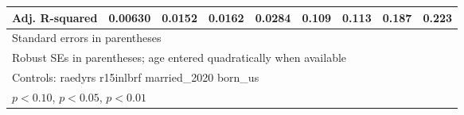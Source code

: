 \begin{table}[htbp]
\begin{tabular}{l*{8}{c}}
Adj. R-squared  &  0.00630         &   0.0152         &   0.0162         &   0.0284         &    0.109         &    0.113         &    0.187         &    0.223         \\
\bottomrule
\multicolumn{9}{l}{\footnotesize Standard errors in parentheses}\\
\multicolumn{9}{l}{\footnotesize Robust SEs in parentheses; age entered quadratically when available}\\
\multicolumn{9}{l}{\footnotesize Controls:  raedyrs r15inlbrf married\_2020 born\_us}\\
\multicolumn{9}{l}{\footnotesize \sym{*} \(p<0.10\), \sym{**} \(p<0.05\), \sym{***} \(p<0.01\)}\\
\end{tabular}
\end{table}

